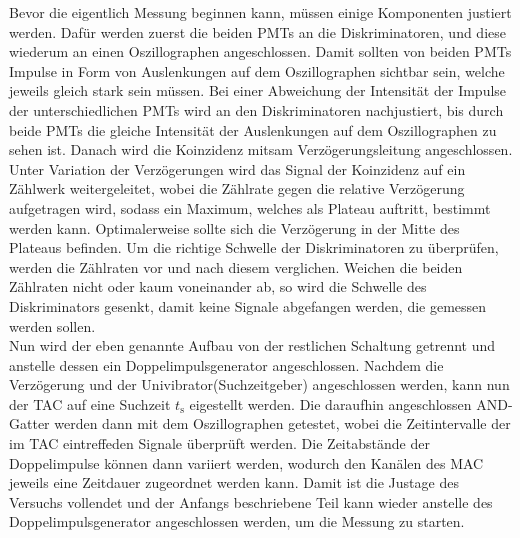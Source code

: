 Bevor die eigentlich Messung beginnen kann, müssen einige Komponenten justiert werden. Dafür werden zuerst die beiden PMTs an die Diskriminatoren, und diese wiederum an einen 
Oszillographen angeschlossen. Damit sollten von beiden PMTs Impulse in Form von Auslenkungen auf dem Oszillographen sichtbar sein, welche jeweils gleich stark sein müssen. 
Bei einer Abweichung der Intensität der Impulse der unterschiedlichen PMTs wird an den Diskriminatoren nachjustiert, bis durch beide PMTs die gleiche Intensität der Auslenkungen
auf dem Oszillographen zu sehen ist. Danach wird die Koinzidenz mitsam Verzögerungsleitung angeschlossen. Unter Variation der Verzögerungen wird das Signal der Koinzidenz auf ein Zählwerk 
weitergeleitet, wobei die Zählrate gegen die relative Verzögerung aufgetragen wird, sodass ein Maximum, welches als Plateau auftritt, bestimmt werden kann. Optimalerweise sollte 
sich die Verzögerung in der Mitte des Plateaus befinden. Um die richtige Schwelle der Diskriminatoren zu überprüfen, werden die Zählraten vor und nach diesem verglichen. Weichen 
die beiden Zählraten nicht oder kaum voneinander ab, so wird die Schwelle des Diskriminators gesenkt, damit keine Signale abgefangen werden, die gemessen werden sollen. \\
Nun wird der eben genannte Aufbau von der restlichen Schaltung getrennt und anstelle dessen ein Doppelimpulsgenerator angeschlossen. Nachdem die Verzögerung und der 
Univibrator(Suchzeitgeber) angeschlossen werden, kann nun der TAC auf eine Suchzeit $t_\text{s}$ eigestellt werden. Die daraufhin angeschlossen AND-Gatter werden dann mit dem 
Oszillographen getestet, wobei die Zeitintervalle der im TAC eintreffeden Signale überprüft werden. Die Zeitabstände der Doppelimpulse können dann variiert werden, wodurch den 
Kanälen des MAC jeweils eine Zeitdauer zugeordnet werden kann. Damit ist die Justage des Versuchs vollendet und der Anfangs beschriebene Teil kann wieder anstelle des Doppelimpulsgenerator
angeschlossen werden, um die Messung zu starten.